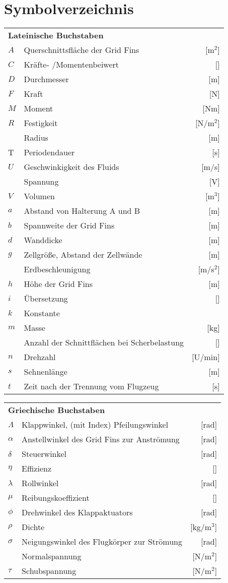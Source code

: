 \chapter*{Symbolverzeichnis}						%

\begin{longtable}[l]{llr}
\multicolumn{3}{l}{\textbf{Lateinische Buchstaben}}\\
$A$&Querschnittsfläche der Grid Fins&[m$^2$]\\
$C$&Kräfte- /Momentenbeiwert&[]\\
$D$&Durchmesser&[m]\\
$F$&Kraft&[N]\\
$M$&Moment&[Nm]\\
$R$&Festigkeit&[N/m$^2$]\\
~&Radius&[m]\\
T&Periodendauer&[s]\\
$U$&Geschwinkigkeit des Fluids&[m/s]\\
~&Spannung&[V]\\
$V$&Volumen&[m$^3$]\\
$a$&Abstand von Halterung A und B&[m]\\
$b$&Spannweite der Grid Fins&[m]\\
$d$&Wanddicke&[m]\\
$g$&Zellgröße, Abstand der Zellwände&[m]\\
~&Erdbeschleunigung&[m/s$^2$]\\
$h$&Höhe der Grid Fins&[m]\\
$i$&Übersetzung&[]\\
$k$&Konstante&~\\
$m$&Masse&[kg]\\
~&Anzahl der Schnittflächen bei Scherbelastung&[]\\
$n$&Drehzahl&[U/min]\\
$s$&Sehnenlänge&[m]\\
$t$&Zeit nach der Trennung vom Flugzeug&[s]\\
\end{longtable}


\begin{longtable}[l]{llr}
	\multicolumn{3}{l}{\textbf{Griechische Buchstaben}}\\
	$\Lambda$&Klappwinkel, (mit Index) Pfeilungswinkel&[rad]\\
	$\alpha$&Anstellwinkel des Grid Fins zur Anströmung&[rad]\\
	$\delta$&Steuerwinkel&[rad]\\
	$\eta$&Effizienz&[]\\
	$\lambda$&Rollwinkel&[rad]\\
	$\mu$&Reibungskoeffizient&[]\\
	$\phi$&Drehwinkel des Klappaktuators&[rad]\\
	$\rho$&Dichte&[kg/m$^3$]\\
	$\sigma$&Neigungswinkel des Flugkörper zur Strömung&[rad]\\
	~&Normalspannung&[N/m$^2$]\\
	$\tau$&Schubspannung&[N/m$^2$]\\
\end{longtable}

